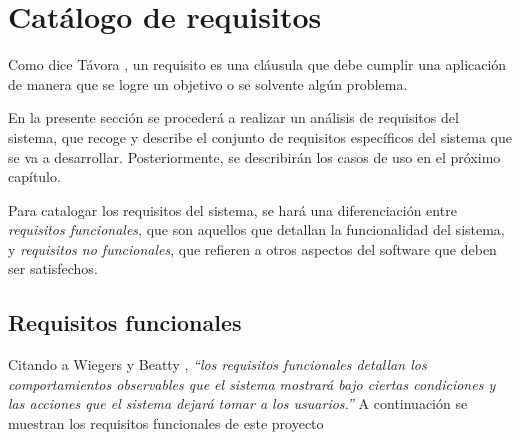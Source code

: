 
\section{Catálogo de requisitos} \label{Requisitos}
Como dice Távora \autocite*{Tavora2014}, un requisito es una cláusula 
que debe cumplir una aplicación de manera que se logre un objetivo 
o se solvente algún problema. \medskip

En la presente sección se procederá a realizar un análisis de 
requisitos del sistema, que recoge y describe el conjunto 
de requisitos específicos del sistema que se va a desarrollar.
Posteriormente, se describirán los casos de uso en el próximo capítulo. \medskip

Para catalogar los requisitos del sistema, se hará una diferenciación entre 
\textit{requisitos funcionales}, que son aquellos que detallan 
la funcionalidad del sistema, y \textit{requisitos no funcionales},
que refieren a otros aspectos del software que deben ser satisfechos.

\subsection{Requisitos funcionales} \label{Requisitos_funcionales}
Citando a Wiegers y Beatty \autocite*{Wiegers2013}, \textit{“los requisitos funcionales 
detallan los comportamientos observables que el sistema mostrará bajo ciertas condiciones 
y las acciones que el sistema dejará tomar a los usuarios.”} A continuación se muestran 
los requisitos funcionales de este proyecto \medskip

